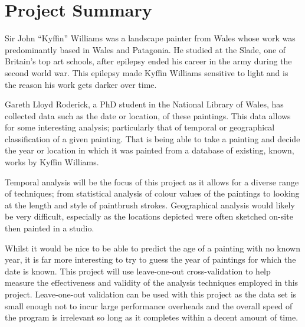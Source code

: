\documentclass[11pt,fleqn,twoside]{article}
\begin{document}

\mmp

\setcounter{tocdepth}{3} %
\tableofcontents
\listoffigures
\listoftables

\newpage

\clearpage
\section{Project Summary}
Sir John ``Kyffin'' Williams was a landscape painter from Wales whose work was predominantly based 
in Wales and Patagonia. He studied at the Slade, one of Britain's top art schools, after epilepsy
ended his career in the army during the second world war. This epilepsy made Kyffin Williams 
sensitive to light and is the reason his work gets darker over time\cite{Harris2011How}.

Gareth Lloyd Roderick, a PhD student in the National Library of Wales, has
collected data such as the date or location, of these paintings. This data allows for some 
interesting analysis; particularly that of temporal or geographical classification of a given 
painting. That is being able to take a painting and decide the year or location in which it was
painted from a database of existing, known, works by Kyffin Williams.

Temporal analysis will be the focus of this project as it allows for a diverse range of techniques;
from statistical analysis of colour values of the paintings to looking at the length and style of 
paintbrush strokes. Geographical analysis would likely be very difficult, especially as the locations
depicted were often sketched on-site then painted in a studio.

Whilst it would be nice to be able to predict the age of a painting with no known year, it is far
more interesting to try to guess the year of paintings for which the date is known. This project 
will use leave-one-out cross-validation to help measure the effectiveness and validity of the 
analysis techniques employed in this project. Leave-one-out validation can be used with this 
project as the data set is small enough not to incur large performance overheads and the overall
speed of the program is irrelevant so long as it completes within a decent amount of time.
\end{document}

